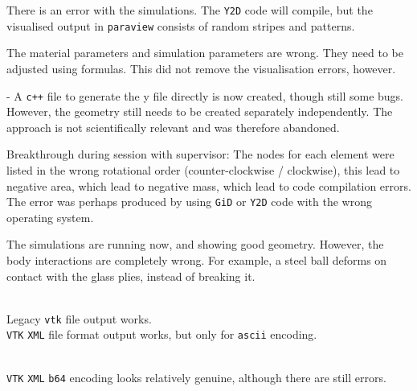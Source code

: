 \bigbreak

\bigbreak
{}
There is an {\color{red} error} with the simulations. The \texttt{Y2D} code will compile, but the visualised output in \texttt{paraview} consists of random stripes and patterns.

\bigbreak
{}
The material parameters and simulation parameters are wrong. They need to be adjusted using formulas. This did not remove the visualisation errors, however.

\bigbreak
{} - {\color{blue}\textbf{}}
A \texttt{c++} file to generate the y file directly is now created, though still some bugs. However, the geometry still needs to be created separately independently. The approach is not scientifically relevant and was therefore abandoned.

\bigbreak
{}
Breakthrough during session with supervisor: The nodes for each element were listed in the wrong rotational order (counter-clockwise / clockwise), this lead to negative area, which lead to negative mass, which lead to code compilation errors. The error was perhaps produced by using \texttt{GiD} or \texttt{Y2D} code with the wrong operating system.

\bigbreak
{}
The simulations are running now, and showing good geometry. However, the body interactions are completely wrong. For example, a steel ball deforms on contact with the glass plies, instead of breaking it.

\bigbreak
{}\\
Legacy \texttt{vtk} file output works. \\
\texttt{VTK} \texttt{XML} file format output works, but only for \texttt{ascii} encoding.

\bigbreak
{}\\
\texttt{VTK} \texttt{XML} \texttt{b64} encoding looks relatively genuine, although there are still errors.
